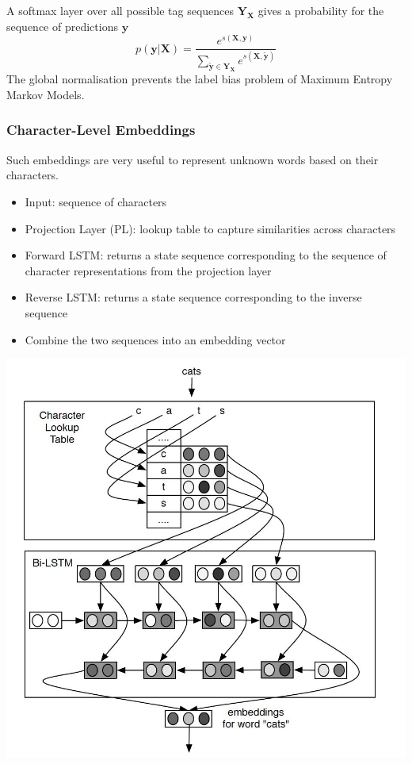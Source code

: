 \documentclass[11pt]{article}
\begin{document}
A softmax layer over all possible tag sequences $\textbf{Y}_{\textbf{X}}$ gives a probability for the sequence of predictions $\textbf{y}$
\begin{equation*}
	p(\textbf{y}|\textbf{X}) = \frac{e^{s(\textbf{X},\textbf{y})}}{\sum_{\tilde{\textbf{y}}\in\textbf{Y}_\textbf{X}} e^{s(\textbf{X},\tilde{\textbf{y}})}}
\end{equation*}
The global normalisation prevents the label bias problem of Maximum Entropy Markov Models.

\subsubsection{Character-Level Embeddings}
Such embeddings are very useful to represent unknown words based on their characters.

\vspace{1em}
\noindent
\begin{minipage}{0.6\linewidth}
	\begin{itemize}
		\item Input: sequence of characters
		\item Projection Layer (PL): lookup table to capture similarities across characters
		\item Forward LSTM: returns a state sequence corresponding to the sequence of character representations from the projection layer
		\item Reverse LSTM: returns a state sequence corresponding to the inverse sequence
		\item Combine the two sequences into an embedding vector
	\end{itemize}
\end{minipage}
\hspace{\fill}
\begin{minipage}{0.35\linewidth}
	\begin{center}
		\includegraphics[width=\linewidth]{img/BiLSTM_character_embedding}
	\end{center}
\end{minipage}
\end{document}

